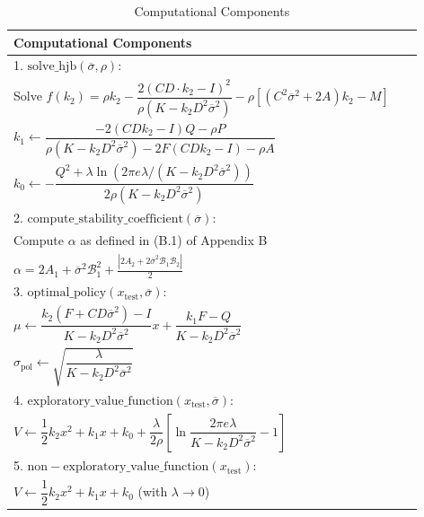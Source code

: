 \documentclass[onecolumn, journal]{IEEEtran} %
\begin{document}
	\begin{table}[H]
		\centering
		\caption{Computational Components}
		\label{tab:computational-components}
		\footnotesize
		\begin{tabular}{@{}p{0.95\linewidth}@{}}
			\toprule
			\textbf{Computational Components}\\
			\midrule
			1. $\mathrm{solve\_hjb}(\overline{\sigma}, \rho)$:\\
			\quad Solve $f(k_2) = \rho k_2 - \dfrac{2(CD \cdot k_2 - I)^2}{\rho(K - k_2 D^2 \overline\sigma^2)} - \rho[(C^2\overline\sigma^2 + 2A)k_2 - M]$\\
			\quad $k_1 \leftarrow \dfrac{-2(CD k_2 - I)Q - \rho P}{\rho(K - k_2 D^2 \overline\sigma^2) - 2F(CD k_2 - I) - \rho A}$\\
			\quad $k_0 \leftarrow -\dfrac{Q^2 + \lambda \ln(2\pi e\lambda/(K - k_2 D^2 \overline\sigma^2))}{2\rho(K - k_2 D^2 \overline\sigma^2)}$\\[4pt]
			
			2. $\mathrm{compute\_stability\_coefficient}(\overline{\sigma})$:\\
			\quad Compute $\alpha$ as defined in (B.1) of Appendix B\\
			\quad $\alpha = 2A_1 + \overline{\sigma}^2 \mathcal{B}_1^2 + \frac{|2A_2 + 2\overline{\sigma}^2 \mathcal{B}_1 \mathcal{B}_2|}{2}$\\[4pt]
			
			3. $\mathrm{optimal\_policy}(x_{\mathrm{test}}, \overline{\sigma})$:\\
			\quad $\mu \leftarrow \dfrac{k_2(F + CD\overline\sigma^2) - I}{K - k_2 D^2 \overline\sigma^2}x + \dfrac{k_1 F - Q}{K - k_2 D^2 \overline\sigma^2}$\\
			\quad $\sigma_{\mathrm{pol}} \leftarrow \sqrt{\dfrac{\lambda}{K - k_2 D^2 \overline\sigma^2}}$\\[4pt]
			
			4. $\mathrm{exploratory\_value\_function}(x_{\mathrm{test}}, \overline{\sigma})$:\\
			\quad $V \leftarrow \dfrac{1}{2}k_2 x^2 + k_1 x + k_0 + \dfrac{\lambda}{2\rho}\left[\ln\dfrac{2\pi e\lambda}{K - k_2 D^2 \overline\sigma^2} - 1\right]$\\[4pt]
			
			5. $\mathrm{non-exploratory\_value\_function}(x_{\mathrm{test}})$:\\
			\quad $V \leftarrow \dfrac{1}{2}k_2 x^2 + k_1 x + k_0$ (with $\lambda \to 0$)\\
			\bottomrule
		\end{tabular}
	\end{table}
	
\end{document}
